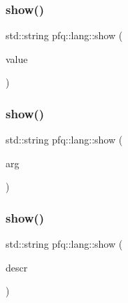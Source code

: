 \mbox{\label{namespacepfq_1_1lang_aaa8805ef12da2a39822f13e96197cadd}} 
\subsubsection{\texorpdfstring{show()}{show()}\hspace{0.1cm}{\footnotesize\ttfamily [2/8]}}
{\footnotesize\ttfamily std\+::string pfq\+::lang\+::show (\begin{DoxyParamCaption}\item[{\hyperlink{structpfq_1_1lang_1_1CIDR}{C\+I\+DR}}]{value }\end{DoxyParamCaption})\hspace{0.3cm}{\ttfamily [inline]}}

\mbox{\label{namespacepfq_1_1lang_a1e54c94175cad1980fc43030d265b58a}} 
\subsubsection{\texorpdfstring{show()}{show()}\hspace{0.1cm}{\footnotesize\ttfamily [3/8]}}
{\footnotesize\ttfamily std\+::string pfq\+::lang\+::show (\begin{DoxyParamCaption}\item[{const \hyperlink{structpfq_1_1lang_1_1argument__type}{argument\+\_\+type} \&}]{arg }\end{DoxyParamCaption})\hspace{0.3cm}{\ttfamily [inline]}}

\mbox{\label{namespacepfq_1_1lang_a7e9458d3c3b90f405ee6df6cbfc43c58}} 
\subsubsection{\texorpdfstring{show()}{show()}\hspace{0.1cm}{\footnotesize\ttfamily [4/8]}}
{\footnotesize\ttfamily std\+::string pfq\+::lang\+::show (\begin{DoxyParamCaption}\item[{const \hyperlink{structpfq_1_1lang_1_1FunctionDescr}{Function\+Descr} \&}]{descr }\end{DoxyParamCaption})\hspace{0.3cm}{\ttfamily [inline]}}

